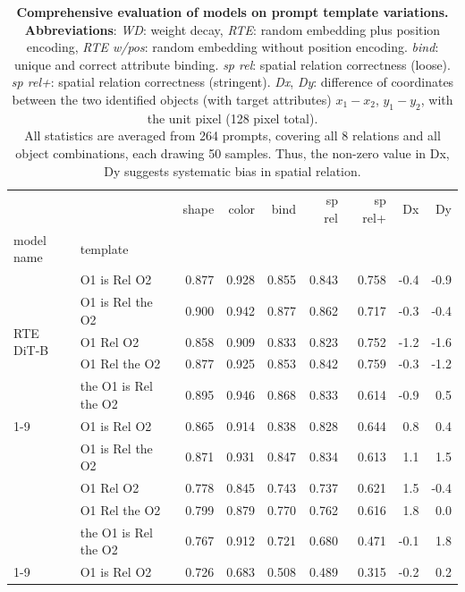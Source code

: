\documentclass[10pt,twocolumn,letterpaper]{article}
\begin{document}
\begin{table}[!htp]
    \centering
        \caption{\textbf{Comprehensive evaluation of models on prompt template variations.} \\
         \textbf{Abbreviations}: \textit{WD}: weight decay, \textit{RTE}: random embedding plus position encoding, \textit{RTE w/pos}: random embedding without position encoding. \textit{bind}: unique and correct attribute binding. \textit{sp rel}: spatial relation correctness (loose). \textit{sp rel+}: spatial relation correctness (stringent). \textit{Dx}, \textit{Dy}: difference of coordinates between the two identified objects (with target attributes) $x_1-x_2$, $y_1-y_2$, with the unit pixel (128 pixel total).  \\
         All statistics are averaged from 264 prompts, covering all 8 relations and all object combinations, each drawing 50 samples. 
         Thus, the non-zero value in Dx, Dy suggests systematic bias in spatial relation. }
    \label{tab:model_cmp_eval_table}
    \small
    \begin{tabular}{llrrrrrrr}
\toprule
 &  & shape & color & bind & sp rel & sp rel+ & Dx & Dy \\
model name & template &  &  &  &  &  &  &  \\
\midrule
\multirow[t]{5}{*}{RTE DiT-B} & O1 is Rel O2 & 0.877 & 0.928 & 0.855 & 0.843 & 0.758 & -0.4 & -0.9 \\
 & O1 is Rel the O2 & 0.900 & 0.942 & 0.877 & 0.862 & 0.717 & -0.3 & -0.4 \\
 & O1 Rel O2 & 0.858 & 0.909 & 0.833 & 0.823 & 0.752 & -1.2 & -1.6 \\
 & O1 Rel the O2 & 0.877 & 0.925 & 0.853 & 0.842 & 0.759 & -0.3 & -1.2 \\
 & the O1 is Rel the O2 & 0.895 & 0.946 & 0.868 & 0.833 & 0.614 & -0.9 & 0.5 \\
\cline{1-9}
\multirow[t]{5}{*}{RTE DiT-mini} & O1 is Rel O2 & 0.865 & 0.914 & 0.838 & 0.828 & 0.644 & 0.8 & 0.4 \\
 & O1 is Rel the O2 & 0.871 & 0.931 & 0.847 & 0.834 & 0.613 & 1.1 & 1.5 \\
 & O1 Rel O2 & 0.778 & 0.845 & 0.743 & 0.737 & 0.621 & 1.5 & -0.4 \\
 & O1 Rel the O2 & 0.799 & 0.879 & 0.770 & 0.762 & 0.616 & 1.8 & 0.0 \\
 & the O1 is Rel the O2 & 0.767 & 0.912 & 0.721 & 0.680 & 0.471 & -0.1 & 1.8 \\
\cline{1-9}
\multirow[t]{5}{*}{RTE DiT-micro} & O1 is Rel O2 & 0.726 & 0.683 & 0.508 & 0.489 & 0.315 & -0.2 & 0.2 \\

\end{tabular}
\end{table}
\end{document}

